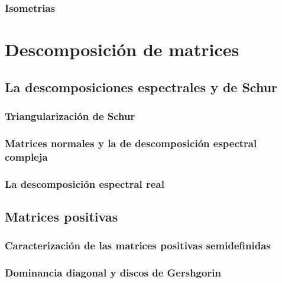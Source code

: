 \subsubsection{Isometrias} %
\label{ssub:isometrias}

\section{Descomposición de matrices} %
\label{sec:descomposicion_de_matrices}

\subsection{La descomposiciones espectrales y de Schur} %
\label{sub:la_descomposiciones_espectrales y de Schur}

\subsubsection{Triangularización de Schur} %
\label{ssub:triangularizacion_de_schur}

\subsubsection{Matrices normales y la de descomposición espectral compleja} %
\label{ssub:matrices_normales_y_la_de_descomposicion_espectral_compleja}

\subsubsection{La descomposición espectral real} %
\label{ssub:la_descomposicion_espectral_real}

\subsection{Matrices positivas} %
\label{sub:Matrices_positivas}

\subsubsection{Caracterización de las matrices positivas semidefinidas} %
\label{ssub:caracterizacion_de_las_matrices_positivas_semidefinidas}

\subsubsection{Dominancia diagonal y discos de Gershgorin} %
\label{ssub:dominancia_diagonal_y_discos_de_gershgorin}


